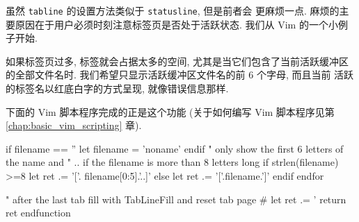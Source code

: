 虽然 \texttt{tabline} 的设置方法类似于 \texttt{statusline}, 但是前者会
更麻烦一点. 麻烦的主要原因在于用户必须时刻注意标签页是否处于活跃状态.
我们从 Vim 的一个小例子开始.

如果标签页过多, 标签就会占据太多的空间, 尤其是当它们包含了当前活跃缓冲区
的全部文件名时. 我们希望只显示活跃缓冲区文件名的前 6 个字母, 而且当前
活跃的标签名以红底白字的方式呈现, 就像错误信息那样.

下面的 Vim 脚本程序完成的正是这个功能 (关于如何编写 Vim 脚本程序见第
\ref{chap:basic_vim_scripting} 章).
\begin{vimscript}
    if filename == ''
      let filename = 'noname'
    endif
    " only show the first 6 letters of the name  and
    " .. if the filename is more than 8 letters long
    if strlen(filename) >=8
        let ret .= '['. filename[0:5].'..]'
    else
         let ret .= '['.filename.']'
    endif
 endfor

 " after the last tab fill with TabLineFill and reset tab page #
  let ret .= '%
  return ret
endfunction
\end{vimscript}
